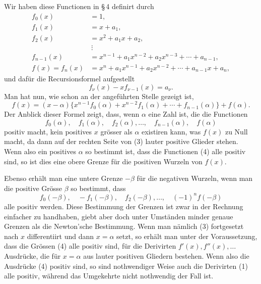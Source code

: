\documentclass[11pt]{article}
\begin{document}
Wir haben diese Functionen in \S\,4 definirt durch
\[
\begin{aligned}
f_0(x)&=1,\\
f_1(x)&=x+a_1,\\
f_2(x)&=x^2+a_1x+a_2,\\
&\ \vdots\\
f_{n-1}(x)&=x^{n-1}+a_1x^{n-2}+a_2x^{n-3}+\cdots+a_{n-1},\\
f(x)=f_n(x)&=x^n+a_1x^{n-1}+a_2x^{n-2}+\cdots+a_{n-1}x+a_n,
\end{aligned}
\]
und dafür die Recursionsformel aufgestellt
\[
        f_\nu(x)-x f_{\nu-1}(x)=a_\nu.
\]
Man hat nun, wie schon an der angeführten Stelle gezeigt ist,
\begin{equation}
        f(x)=(x-\alpha)\{x^{n-1}f_0(\alpha)+x^{n-2}f_1(\alpha)+\cdots+f_{n-1}(\alpha)\}+f(\alpha).
\tag{3}
\end{equation}
Der Anblick dieser Formel zeigt, dass, wenn $\alpha$ eine Zahl ist, die die Functionen
\begin{equation}
        f_0(\alpha),\quad f_1(\alpha),\quad f_2(\alpha),\ldots,\quad f_{n-1}(\alpha),\quad f(\alpha)
\tag{4}
\end{equation}
positiv macht, kein positives $x$ grösser als $\alpha$ existiren kann, was $f(x)$ zu Null macht, da dann auf der rechten Seite von (3) lauter positive Glieder stehen. Wenn also ein positives $\alpha$ so bestimmt ist, dass die Functionen (4) alle positiv sind, so ist dies eine obere Grenze für die positiven Wurzeln von $f(x)$.

Ebenso erhält man eine untere Grenze $-\beta$ für die negativen Wurzeln, wenn man die positive Grösse $\beta$ so bestimmt, dass
\begin{equation}
        f_0(-\beta),\quad -f_1(-\beta),\quad f_2(-\beta),\ldots,\quad (-1)^n f(-\beta)
\tag{5}
\end{equation}
alle positiv werden. Diese Bestimmung der Grenzen ist zwar in der Rechnung einfacher zu handhaben, giebt aber doch unter Umständen minder genaue Grenzen als die Newton'sche Bestimmung. Wenn man nämlich (3) fortgesetzt nach $x$ differentiirt und dann $x=\alpha$ setzt, so erhält man unter der Voraussetzung, dass die Grössen (4) alle positiv sind, für die Derivirten $f'(x),f''(x),\ldots$ Ausdrücke, die für $x=\alpha$ aus lauter positiven Gliedern bestehen. Wenn also die Ausdrücke (4) positiv sind, so sind nothwendiger Weise auch die Derivirten (1) alle positiv, während das Umgekehrte nicht nothwendig der Fall ist.
\end{document}
